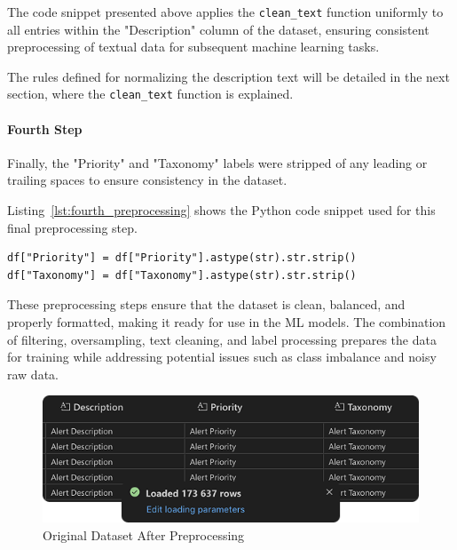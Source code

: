 The code snippet presented above applies the \texttt{clean\_text} function uniformly to all entries within the "Description" column of the dataset, ensuring consistent preprocessing of textual data for subsequent machine learning tasks.

The rules defined for normalizing the description text will be detailed in the next section, where the \texttt{clean\_text} function is explained.

\paragraph{Fourth Step}

Finally, the "Priority" and "Taxonomy" labels were stripped of any leading or trailing spaces to ensure consistency in the dataset. 

Listing~\ref{lst:fourth_preprocessing} shows the Python code snippet used for this final preprocessing step.

\vspace{0.2cm}
\noindent
\begin{minipage}{\linewidth}
\begin{verbatim}
df["Priority"] = df["Priority"].astype(str).str.strip()
df["Taxonomy"] = df["Taxonomy"].astype(str).str.strip()
\end{verbatim}
\label{lst:fourth_preprocessing}
\end{minipage}
\vspace{0.1cm}

These preprocessing steps ensure that the dataset is clean, balanced, and properly formatted, making it ready for use in the ML models. 
The combination of filtering, oversampling, text cleaning, and label processing prepares the data for training while addressing potential issues such as class imbalance and noisy raw data.

\begin{figure}[h!]
    \centering
    \includegraphics[width=\textwidth]{ch3/assets/dataset_processed.png}
    \caption{Original Dataset After Preprocessing}
    \label{fig:dataset_processed}
\end{figure}


